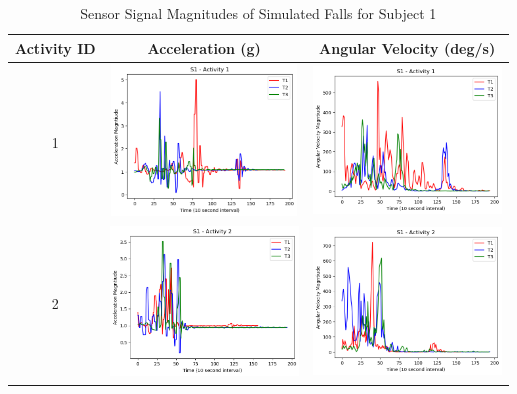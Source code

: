 \documentclass{llncs}
\begin{document}
 \begin{table}
	\begin{center}
		\caption{Sensor Signal Magnitudes of Simulated Falls for Subject 1}
		\label{table3}
		\begin{tabular}{|c|c|c|}
			\toprule
			Activity ID & Acceleration (g) & Angular Velocity (deg/s)\\
			\midrule
			1 & \includegraphics[width=5cm, height=4cm]{images/Acceleration/S1_Activity1.png} & \includegraphics[width=5cm, height=4cm]{images/AngularVelocity/S1_Activity1.png}\\
			\midrule
			2 & \includegraphics[width=5cm, height=4cm]{images/Acceleration/S1_Activity2.png} & \includegraphics[width=5cm, height=4cm]{images/AngularVelocity/S1_Activity2.png}\\
			\midrule

\end{tabular}
\end{center}
\end{table}
\end{document}
